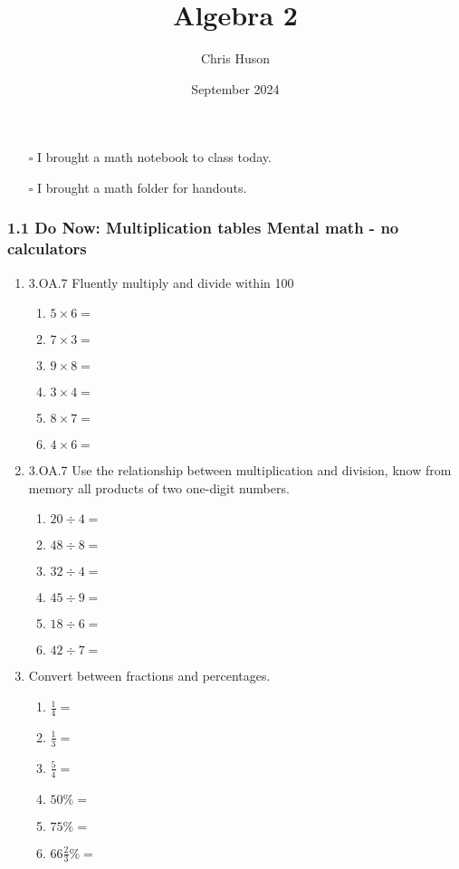 \documentclass[12pt, twoside]{article}
\title{Algebra 2}
\author{Chris Huson}
\date{September 2024}
\begin{document}
\begin{itemize}
    \item[$\square$] I brought a math notebook to class today.
    \item[$\square$] I brought a math folder for handouts.
\end{itemize}


\subsubsection*{1.1 Do Now: Multiplication tables \hfill Mental math - no calculators}
\begin{enumerate}[itemsep=0.5cm]

\item 3.OA.7 Fluently multiply and divide within 100
    \begin{multicols}{2}
    \begin{enumerate}[itemsep=0.5cm]
        \item $5 \times 6 =$
        \item $7 \times 3 =$
        \item $9 \times 8 =$
        \item $3 \times 4 =$
        \item $8 \times 7 =$
        \item $4 \times 6 =$
    \end{enumerate}
    \end{multicols}

\item 3.OA.7 Use the relationship between multiplication and division, know from memory all products of two one-digit numbers.
    \begin{multicols}{2}
    \begin{enumerate}[itemsep=0.5cm]
        \item $20 \div 4 =$
        \item $48 \div 8 =$
        \item $32 \div 4 =$
        \item $45 \div 9 =$
        \item $18 \div 6 =$
        \item $42 \div 7 =$
    \end{enumerate}
    \end{multicols}

\item Convert between fractions and percentages.
\begin{multicols}{2}
\begin{enumerate}[itemsep=0.5cm]
    \item $\frac{1}{4}=$
    \item $\frac{1}{3}=$
    \item $\frac{5}{4}=$
    \item $50\% =$
    \item $75\% =$
    \item $66 \frac{2}{3}\% =$
\end{enumerate}
\end{multicols}


\end{enumerate}
\end{document}
